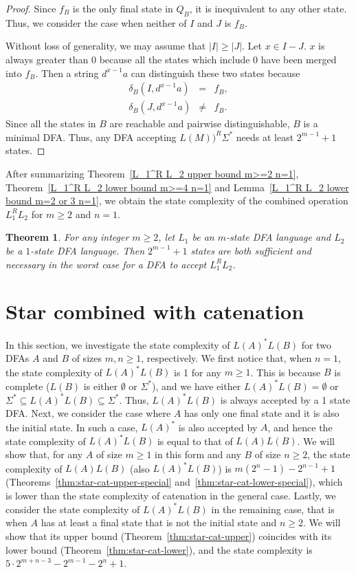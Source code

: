 \documentclass[10pt]{article}
\newtheorem{theorem}{Theorem}
\begin{document}
\begin{proof}
Since $f_B$ is the only final state in $Q_B$, it is inequivalent to
any other state. Thus, we consider the case when neither of $I$ and
$J$ is $f_B$.

Without loss of generality, we may assume that $|I|\geq |J|$. Let
$x\in I-J$. $x$ is always greater than $0$ because all the states
which include $0$ have been merged into $f_B$. Then a string
$d^{x-1}a$ can distinguish these two states because
\begin{eqnarray*}
\delta_B(I, d^{x-1}a)& = & f_B,\\
\delta_B(J, d^{x-1}a) & \neq & f_B.
\end{eqnarray*}
Since all the states in $B$ are reachable and pairwise
distinguishable, $B$ is a minimal DFA. Thus, any DFA accepting
$L(M))^R\Sigma^*$ needs at least $2^{m-1}+1$ states.
\end{proof}

After summarizing Theorem~\ref{L_1^R L_2 upper bound m>=2 n=1},
Theorem~\ref{L_1^R L_2 lower bound m>=4 n=1} and Lemma~\ref{L_1^R
L_2 lower bound m=2 or 3 n=1}, we obtain the state complexity of the
combined operation $L_1^RL_2$ for $m \ge 2$ and $n=1$.

\begin{theorem}
\label{L_1^R L_2 state complexity m>=2 n=1} For any integer $m \ge
2$, let $L_1$ be an $m$-state DFA language and $L_2$ be a $1$-state
DFA language. Then $2^{m-1}+1$ states are both sufficient and
necessary in the worst case for a DFA to accept $L_1^RL_2$.
\end{theorem}

\section{Star combined with catenation}\label{sec:star-cat}
In this section, we investigate the state complexity of $L(A)^*L(B)$ for two DFAs $A$ and $B$ of sizes $m,n \ge 1$, respectively.
We first notice that, when $n = 1$, the state complexity of $L(A)^*L(B)$ is 1 for any $m \ge 1$.
This is because $B$ is complete ($L(B)$ is either $\emptyset$ or $\Sigma^*$), and we have either $L(A)^*L(B) = \emptyset$ or $\Sigma^* \subseteq L(A)^*L(B) \subseteq \Sigma^*$.
Thus, $L(A)^*L(B)$ is always accepted by a 1 state DFA.
Next, we consider the case where $A$ has only one final state and it is also the initial state.
In such a case, $L(A)^*$ is also accepted by $A$, and hence the state complexity of $L(A)^*L(B)$ is equal to that of $L(A)L(B)$.
We will show that, for any $A$ of size $m \ge 1$ in this form and any $B$ of size $n \ge 2$, the state complexity of $L(A)L(B)$ (also $L(A)^*L(B)$) is $m(2^n-1) - 2^{n-1} + 1$ (Theorems~\ref{thm:star-cat-upper-special} and~\ref{thm:star-cat-lower-special}), which is lower than the state complexity of catenation in the general case.
Lastly, we consider the state complexity of $L(A)^*L(B)$ in the remaining case, that is when $A$ has at least a final state that is not the initial state and $n \ge 2$.
We will show that its upper bound (Theorem~\ref{thm:star-cat-upper}) coincides with its lower bound (Theorem~\ref{thm:star-cat-lower}), and the state complexity is $5 \cdot 2^{m+n-3} - 2^{m-1} - 2^n +1$.
\end{document}
